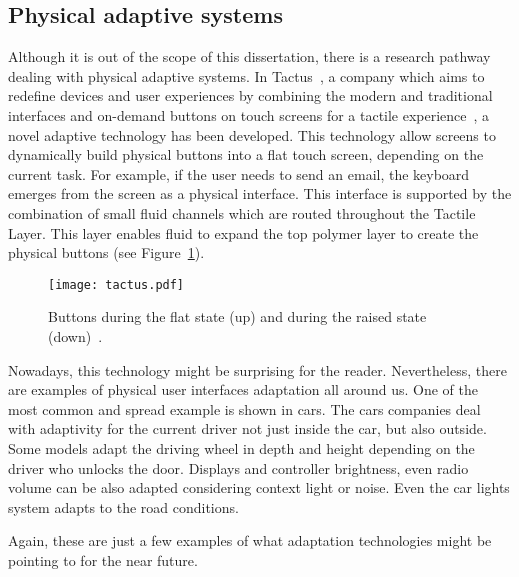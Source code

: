 \subsection{Physical adaptive systems}
\label{sec:pyshical_adaptive_sistems}

Although it is out of the scope of this dissertation, there is a research
pathway dealing with physical adaptive systems. In Tactus~\citep{tactus}, a
company which aims to redefine devices and user experiences by combining the 
modern and traditional interfaces and on-demand buttons on touch
screens for a tactile experience~\citep{tactus_linkedin}, a novel adaptive
technology has been developed. This technology allow screens to dynamically build
physical buttons into a flat touch screen, depending on the current task. For example,
if the user needs to send an email, the keyboard emerges from the screen
as a physical interface. This interface is supported by the combination of
small fluid channels which are routed throughout the Tactile Layer. This layer
enables fluid to expand the top polymer layer to create the physical buttons (see
Figure~\ref{fig:tactus}).

\begin{figure}[H]
\centering
\texttt{[image: tactus.pdf]}
\caption{Buttons during the flat state (up) and during the raised state (down)~\citep{tactus}.}
\label{fig:tactus}
\end{figure}

Nowadays, this technology might be surprising for the reader. Nevertheless, there
are examples of physical user interfaces adaptation all around us. One of the most
common and spread example is shown in cars. The cars companies deal with adaptivity
for the current driver not just inside the car, but also outside. Some models
adapt the driving wheel in depth and height depending on the driver who unlocks
the door. Displays and controller brightness, even radio volume can be also
adapted considering context light or noise. Even the car lights system adapts
to the road conditions.

Again, these are just a few examples of what adaptation technologies might
be pointing to for the near future.


